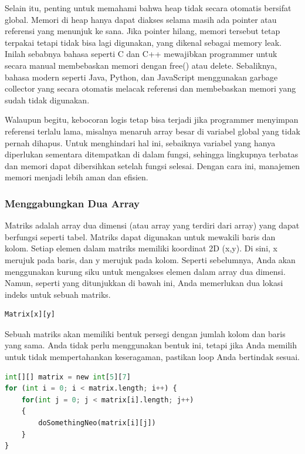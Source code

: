 \documentclass{article}
\begin{document}
Selain itu, penting untuk memahami bahwa heap tidak secara otomatis bersifat global. Memori di heap hanya dapat diakses selama masih ada pointer atau referensi yang menunjuk ke sana. Jika pointer hilang, memori tersebut tetap terpakai tetapi tidak bisa lagi digunakan, yang dikenal sebagai memory leak. Inilah sebabnya bahasa seperti C dan C++ mewajibkan programmer untuk secara manual membebaskan memori dengan free() atau delete. Sebaliknya, bahasa modern seperti Java, Python, dan JavaScript menggunakan garbage collector yang secara otomatis melacak referensi dan membebaskan memori yang sudah tidak digunakan.

Walaupun begitu, kebocoran logis tetap bisa terjadi jika programmer menyimpan referensi terlalu lama, misalnya menaruh array besar di variabel global yang tidak pernah dihapus. Untuk menghindari hal ini, sebaiknya variabel yang hanya diperlukan sementara ditempatkan di dalam fungsi, sehingga lingkupnya terbatas dan memori dapat dibersihkan setelah fungsi selesai. Dengan cara ini, manajemen memori menjadi lebih aman dan efisien.

\subsubsection{Menggabungkan Dua Array}
Matriks adalah array dua dimensi (atau array yang terdiri dari array) yang dapat berfungsi seperti tabel. Matriks dapat digunakan untuk mewakili baris dan kolom. Setiap elemen dalam matriks memiliki koordinat 2D (x,y). Di sini, x merujuk pada baris, dan y merujuk pada kolom. Seperti sebelumnya, Anda akan menggunakan kurung siku untuk mengakses elemen dalam array dua dimensi. Namun, seperti yang ditunjukkan di bawah ini, Anda memerlukan dua lokasi indeks untuk sebuah matriks.

\begin{lstlisting}[language=Python, caption={}, captionpos=b]
    Matrix[x][y]
\end{lstlisting}

Sebuah matriks akan memiliki bentuk persegi dengan jumlah kolom dan baris yang sama. Anda tidak perlu menggunakan bentuk ini, tetapi jika Anda memilih untuk tidak mempertahankan keseragaman, pastikan loop Anda bertindak sesuai.

\begin{lstlisting}[language=Python, caption={}, captionpos=b]
int[][] matrix = new int[5][7]
for (int i = 0; i < matrix.length; i++) {
    for(int j = 0; j < matrix[i].length; j++)
    {
        doSomethingNeo(matrix[i][j])
    }
}
\end{lstlisting}
\end{document}
